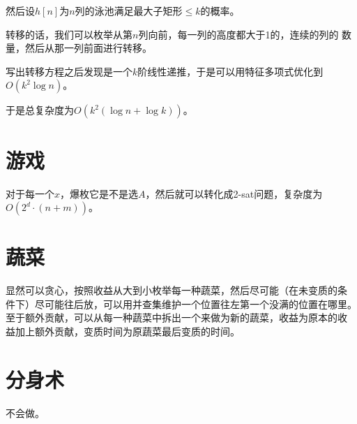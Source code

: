 \documentclass[a4paper]{article}
\begin{document}
然后设$h[n]$为$n$列的泳池满足最大子矩形$\leq k$的概率。

转移的话，我们可以枚举从第$n$列向前，每一列的高度都大于1的，连续的列的
数量，然后从那一列前面进行转移。

写出转移方程之后发现是一个$k$阶线性递推，于是可以用特征多项式优化到
$O(k^2\log n)$。

于是总复杂度为$O(k^2(\log n+\log k))$。

\section{游戏}

对于每一个$x$，爆枚它是不是选$A$，然后就可以转化成2-sat问题，复杂度为
$O(2^d\cdot (n+m))$。

\section{蔬菜}

显然可以贪心，按照收益从大到小枚举每一种蔬菜，然后尽可能（在未变质的条
件下）尽可能往后放，可以用并查集维护一个位置往左第一个没满的位置在哪里。
至于额外贡献，可以从每一种蔬菜中拆出一个来做为新的蔬菜，收益为原本的收
益加上额外贡献，变质时间为原蔬菜最后变质的时间。

\section{分身术}

不会做。
\end{document}
